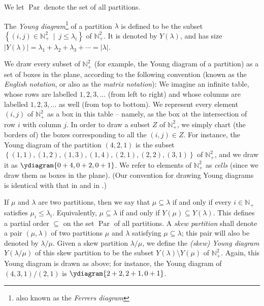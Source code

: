 \documentclass[numbers=enddot,12pt,final,onecolumn,notitlepage]{scrartcl}%
\theoremstyle{definition}
\begin{document}
We let $\operatorname*{Par}$ denote the set of all partitions.

The \textit{Young diagram}\footnote{also known as the \textit{Ferrers
diagram}} of a partition $\lambda$ is defined to be the subset $\left\{
\left(  i,j\right)  \in\mathbb{N}_{+}^{2}\ \mid\ j\leq\lambda_{i}\right\}  $
of $\mathbb{N}_{+}^{2}$. It is denoted by $Y\left(  \lambda\right)  $, and has
size $\left\vert Y\left(  \lambda\right)  \right\vert =\lambda_{1}+\lambda
_{2}+\lambda_{3}+\cdots=\left\vert \lambda\right\vert $.

We draw every subset of $\mathbb{N}_{+}^{2}$ (for example, the Young diagram
of a partition) as a set of boxes in the plane, according to the following
convention (known as the \textit{English notation}, or also as the
\textit{matrix notation}): We imagine an infinite table, whose rows are
labelled $1,2,3,\ldots$ (from left to right) and whose columns are labelled
$1,2,3,\ldots$ as well (from top to bottom). We represent every element
$\left(  i,j\right)  $ of $\mathbb{N}_{+}^{2}$ as a box in this table --
namely, as the box at the intersection of row $i$ with column $j$. In order to
draw a subset $Z$ of $\mathbb{N}_{+}^{2}$, we simply chart (the borders of)
the boxes corresponding to all the $\left(  i,j\right)  \in Z$. For instance,
the Young diagram of the partition $\left(  4,2,1\right)  $ is the subset
$\left\{  \left(  1,1\right)  ,\left(  1,2\right)  ,\left(  1,3\right)
,\left(  1,4\right)  ,\left(  2,1\right)  ,\left(  2,2\right)  ,\left(
3,1\right)  \right\}  $ of $\mathbb{N}_{+}^{2}$, and we draw it as $%
\ydiagram{0+4,0+2,0+1}%
$. We refer to elements of $\mathbb{N}_{+}^{2}$ as \textit{cells} (since we
draw them as boxes in the plane). (Our convention for drawing Young diagrams
is identical with that in \cite{Fulton97} and in \cite{GriRei15}.)

If $\mu$ and $\lambda$ are two partitions, then we say that $\mu
\subseteq\lambda$ if and only if every $i\in\mathbb{N}_{+}$ satisfies $\mu
_{i}\leq\lambda_{i}$. Equivalently, $\mu\subseteq\lambda$ if and only if
$Y\left(  \mu\right)  \subseteq Y\left(  \lambda\right)  $. This defines a
partial order $\subseteq$ on the set $\operatorname*{Par}$ of all partitions.
A \textit{skew partition} shall denote a pair $\left(  \mu,\lambda\right)  $
of two partitions $\mu$ and $\lambda$ satisfying $\mu\subseteq\lambda$; this
pair will also be denoted by $\lambda/\mu$. Given a skew partition
$\lambda/\mu$, we define the \textit{(skew) Young diagram} $Y\left(
\lambda/\mu\right)  $ of this skew partition to be the subset $Y\left(
\lambda\right)  \setminus Y\left(  \mu\right)  $ of $\mathbb{N}_{+}^{2}$.
Again, this Young diagram is drawn as above; for instance, the Young diagram
of $\left(  4,3,1\right)  /\left(  2,1\right)  $ is $%
\ydiagram{2+2,2+1,0+1}%
$.
\end{document}
